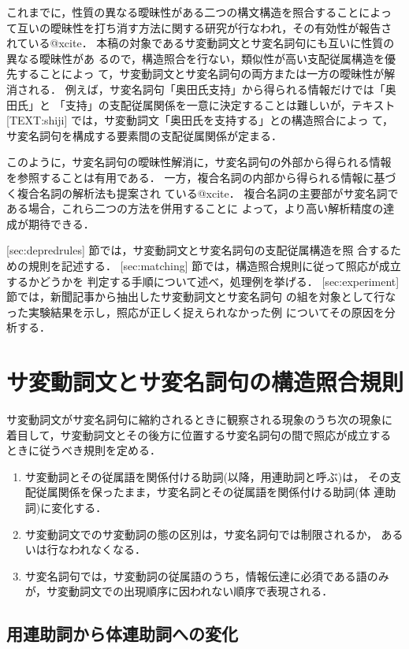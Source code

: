 これまでに，性質の異なる曖昧性がある二つの構文構造を照合することによっ
て互いの曖昧性を打ち消す方法に関する研究が行なわれ，その有効性が報告さ
れている@xcite．
本稿の対象であるサ変動詞文とサ変名詞句にも互いに性質の異なる曖昧性があ
るので，構造照合を行ない，類似性が高い支配従属構造を優先することによっ
て，サ変動詞文とサ変名詞句の両方または一方の曖昧性が解消される．
例えば，サ変名詞句「奥田氏支持」から得られる情報だけでは「奥田氏」と
「支持」の支配従属関係を一意に決定することは難しいが，テキスト
[TEXT:shiji] では，サ変動詞文「奥田氏を支持する」との構造照合によっ
て，サ変名詞句を構成する要素間の支配従属関係が定まる．

このように，サ変名詞句の曖昧性解消に，サ変名詞句の外部から得られる情報
を参照することは有用である．
一方，複合名詞の内部から得られる情報に基づく複合名詞の解析法も提案され
ている@xcite．
複合名詞の主要部がサ変名詞である場合，これら二つの方法を併用することに
よって，より高い解析精度の達成が期待できる．

[sec:depredrules] 節では，サ変動詞文とサ変名詞句の支配従属構造を照
合するための規則を記述する．
[sec:matching] 節では，構造照合規則に従って照応が成立するかどうかを
判定する手順について述べ，処理例を挙げる．
[sec:experiment] 節では，新聞記事から抽出したサ変動詞文とサ変名詞句
の組を対象として行なった実験結果を示し，照応が正しく捉えられなかった例
についてその原因を分析する．

\section{サ変動詞文とサ変名詞句の構造照合規則}


サ変動詞文がサ変名詞句に縮約されるときに観察される現象のうち次の現象に
着目して，サ変動詞文とその後方に位置するサ変名詞句の間で照応が成立する
ときに従うべき規則を定める．
\begin{enumerate}
\item  サ変動詞とその従属語を関係付ける助詞(以降，用連助詞と呼ぶ)は，
その支配従属関係を保ったまま，サ変名詞とその従属語を関係付ける助詞(体
連助詞)に変化する．
\item サ変動詞文でのサ変動詞の態の区別は，サ変名詞句では制限されるか，
あるいは行なわれなくなる．
\item サ変名詞句では，サ変動詞の従属語のうち，情報伝達に必須である語のみ
が，サ変動詞文での出現順序に因われない順序で表現される．
\end{enumerate}

\subsection{用連助詞から体連助詞への変化}

